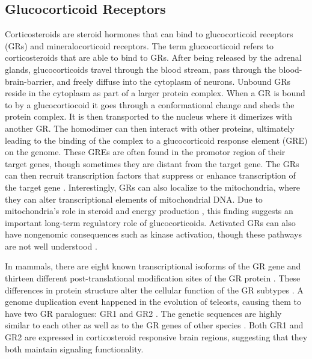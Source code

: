 \documentclass[12pt,twoside]{reedthesis}
\begin{document}
\subsection{Glucocorticoid Receptors}
Corticosteroids are steroid hormones that can bind to glucocorticoid receptors (GRs)
and mineralocorticoid receptors. The term glucocorticoid refers to
corticosteroids that are able to bind to GRs. After being
released by the adrenal glands, glucocorticoids travel through the blood stream,
pass through the blood-brain-barrier, and freely diffuse into the cytoplasm of
neurons. Unbound GRs reside in the cytoplasm as part of a larger protein
complex. When a GR is bound to by a glucocortiocoid it goes through a
conformational change and sheds the protein complex. It is then
transported to the nucleus where it dimerizes with another GR. The homodimer
can then interact with other proteins, ultimately leading to the binding of the
complex to a glucocorticoid response element (GRE) on the genome. These GREs are often
found in the promotor region of their target genes, though sometimes they are
distant from the target gene. The GRs can then recruit
transcription factors that suppress or enhance transcription of the target gene
\citep{2017Nrid, herman_limbic_2005}. Interestingly, GRs can also localize to the mitochondria,
where they can alter transcriptional elements of mitochondrial DNA. Due to
mitochondria's role in steroid and energy production \citep{lapp_stress_2019}, this finding
suggests an important long-term regulatory role of glucocorticoids. Activated GRs can also have nongenomic consequences such as kinase
activation, though these pathways are not well understood \citep{samarasinghe_nongenomic_2011}.

In mammals, there are eight known transcriptional isoforms of the GR gene \citep{saif_expression_2015} and
thirteen different post-translational modification sites of the GR protein \citep{oakley_biology_2013}. These differences in protein structure alter the
cellular function of the GR subtypes \citep{lu_selective_2007}. A genome duplication event happened in the evolution of teleosts, causing them
to have two GR paralogues: GR1 and GR2 \citep{Glasauer2014}. The genetic sequences are
highly similar to each other as well as to the GR genes of other species \citep{greenwood_multiple_2003}.
Both GR1 and GR2 are expressed in corticosteroid
responsive brain regions,
suggesting that they both maintain signaling functionality.
\end{document}
